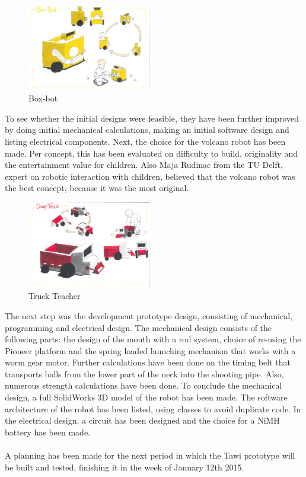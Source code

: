 \documentclass[11pt,twoside,a4paper]{report}
\begin{document}
\begin{figure}
    \includegraphics[width=0.48\textwidth]{Images/BoxBotConcept.pdf}
  \caption{Box-bot}
  \label{figure:boxbot}
\end{figure}
To see whether the initial designs were feasible, they have been further improved by doing initial mechanical calculations, making an initial software design and listing electrical components. Next, the choice for the volcano robot has been made. Per concept, this has been evaluated on difficulty to build, originality and the entertainment value for children. Also Maja Rudinac from the TU Delft, expert on robotic interaction with children, believed that the volcano robot was the best concept, because it was the most original.

\begin{figure}
    \includegraphics[width=0.48\textwidth]{Images/TruckTeacherConcept.pdf}
  \caption{Truck Teacher}
  \label{figure:truckteacher}
\end{figure} 
 
The next step was the development prototype design, consisting of mechanical, programming and electrical design. The mechanical design consists of the following parts: the design of the mouth with a rod system, choice of re-using the Pioneer platform and the spring loaded launching mechanism that works with a worm gear motor. Further calculations have been done on the timing belt that transports balls from the lower part of the neck into the shooting pipe. Also, numerous strength calculations have been done. To conclude the mechanical design, a full SolidWorks 3D model of the robot has been made. The software architecture of the robot has been listed, using classes to avoid duplicate code. In the electrical design, a circuit has been designed and the choice for a NiMH battery has been made.  \\
 \\
A planning has been made for the next period in which the Tawi prototype will be built and tested, finishing it in the week of January 12th 2015.
\end{document}

